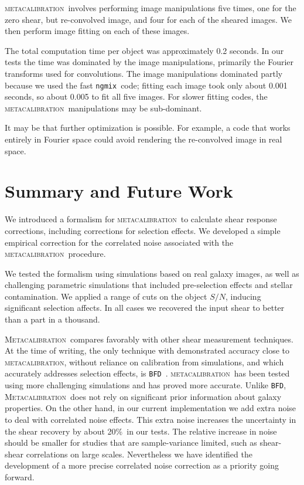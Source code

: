 \documentclass[iop]{emulateapj}
\newcommand{\degrade}{20\%}
\newcommand{\snr}{$S/N$}
\newcommand{\mcal}{\textsc{metacalibration}}
\newcommand{\Mcal}{\textsc{Metacalibration}}
\newcommand{\ngmix}{\texttt{ngmix}}
\newcommand{\bfd}{\texttt{BFD}}
\begin{document}
\mcal\ involves performing image manipulations five times, one for the zero
shear, but re-convolved image, and four for each of the sheared images.
We then perform image fitting on each of these images.

The total computation time per object was approximately 0.2 seconds.  In our
tests the time was dominated by the image manipulations, primarily the Fourier
transforms used for convolutions.  The image manipulations dominated partly
because we used the fast \ngmix\ code; fitting each image took only about 0.001
seconds, so about 0.005 to fit all five images.  For slower fitting codes, the
\mcal\ manipulations may be sub-dominant.

It may be that further optimization is possible.  For example, a code that
works entirely in Fourier space could avoid rendering the re-convolved image in
real space.

\section{Summary and Future Work} \label{sec:summary}

We introduced a formalism for \mcal\ to calculate shear response corrections,
including corrections for selection effects. We developed a simple empirical
correction for the correlated noise associated with the \mcal\ procedure.

We tested the formalism using simulations based on real galaxy images, as well
as challenging parametric simulations that included pre-selection effects and
stellar contamination.  We applied a range of cuts on the object \snr, inducing
significant selection affects.  In all cases we recovered the input shear to
better than a part in a thousand.

\Mcal\ compares favorably with other shear measurement techniques.  At the time
of writing, the only technique with demonstrated accuracy close to \mcal,
without reliance on calibration from simulations, and which accurately
addresses selection effects, is \bfd\ \citep{bfd2016}.  \mcal\ has been tested
using more challenging simulations and has proved more accurate.  Unlike \bfd,
\Mcal\ does not rely on significant prior information about galaxy properties.
On the other hand, in our current implementation we add extra noise to deal
with correlated noise effects.  This extra noise increases the uncertainty in
the shear recovery by about \degrade\ in our tests. The relative increase in
noise should be smaller for studies that are sample-variance limited, such as
shear-shear correlations on large scales. Nevertheless we have identified the
development of a more precise correlated noise correction as a priority going
forward.
\end{document}
